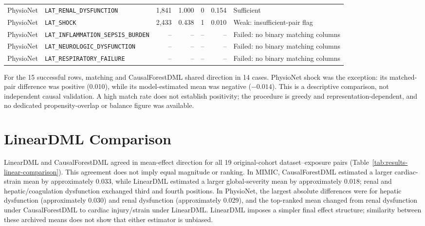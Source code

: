 \begin{longtable}{@{}lL{0.32\textwidth}rrrrL{0.20\textwidth}@{}}
PhysioNet & \nolinkurl{LAT_RENAL_DYSFUNCTION} & 1,841 & 1.000 & 0 & 0.154 & Sufficient \\
PhysioNet & \nolinkurl{LAT_SHOCK} & 2,433 & 0.438 & 1 & 0.010 & Weak: insufficient-pair flag \\
PhysioNet & \nolinkurl{LAT_INFLAMMATION_SEPSIS_BURDEN} & -- & -- & -- & -- & Failed: no binary matching columns \\
PhysioNet & \nolinkurl{LAT_NEUROLOGIC_DYSFUNCTION} & -- & -- & -- & -- & Failed: no binary matching columns \\
PhysioNet & \nolinkurl{LAT_RESPIRATORY_FAILURE} & -- & -- & -- & -- & Failed: no binary matching columns \\
\bottomrule
\end{longtable}
\endgroup

For the 15 successful rows, matching and CausalForestDML shared direction in 14 cases.  PhysioNet shock was the exception: its matched-pair difference was positive (0.010), while its model-estimated mean was negative ($-0.014$).  This is a descriptive comparison, not independent causal validation.  A high match rate does not establish positivity; the procedure is greedy and representation-dependent, and no dedicated propensity-overlap or balance figure was available.

\section{LinearDML Comparison}
\label{sec:results:linear-dml-comparison}

LinearDML and CausalForestDML agreed in mean-effect direction for all 19 original-cohort dataset--exposure pairs (Table~\ref{tab:results-linear-comparison}).  This agreement does not imply equal magnitude or ranking.  In MIMIC, CausalForestDML estimated a larger cardiac-strain mean by approximately 0.033, while LinearDML estimated a larger global-severity mean by approximately 0.018; renal and hepatic/coagulation dysfunction exchanged third and fourth positions.  In PhysioNet, the largest absolute differences were for hepatic dysfunction (approximately 0.030) and renal dysfunction (approximately 0.029), and the top-ranked mean changed from renal dysfunction under CausalForestDML to cardiac injury/strain under LinearDML.  LinearDML imposes a simpler final effect structure; similarity between these archived means does not show that either estimator is unbiased.

